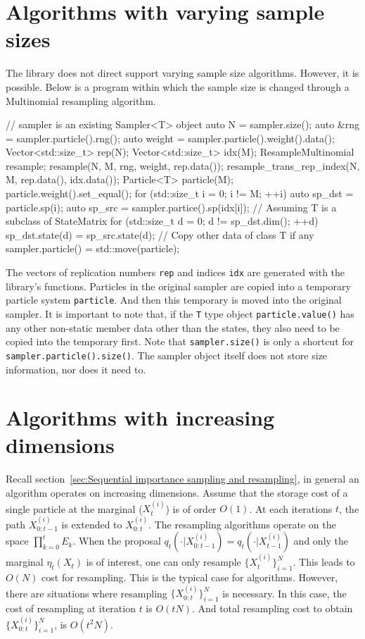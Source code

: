 \section{Algorithms with varying sample sizes}
\label{sec:Algorithms with varying sample sizes}

The library does not direct support varying sample size algorithms. However, it
is possible. Below is a program within which the sample size is changed through
a Multinomial resampling algorithm.
\begin{cppcode}
  // sampler is an existing Sampler<T> object
  auto N = sampler.size();
  auto &rng = sampler.particle().rng();
  auto weight = sampler.particle().weight().data();
  Vector<std::size_t> rep(N);
  Vector<std::size_t> idx(M);
  ResampleMultinomial resample;
  resample(N, M, rng, weight, rep.data());
  resample_trans_rep_index(N, M, rep.data(), idx.data());
  Particle<T> particle(M);
  particle.weight().set_equal();
  for (std::size_t i = 0; i != M; ++i) {
      auto sp_dst = particle.sp(i);
      auto sp_src = sampler.partice().sp(idx[i]);
      // Assuming T is a subclass of StateMatrix
      for (std::size_t d = 0; d != sp_dst.dim(); ++d)
          sp_dst.state(d) = sp_src.state(d);
  }
  // Copy other data of class T if any
  sampler.particle() = std::move(particle);
\end{cppcode}
The vectors of replication numbers \verb|rep| and indices \verb|idx| are
generated with the library's functions. Particles in the original sampler are
copied into a temporary particle system \verb|particle|. And then this
temporary is moved into the original sampler. It is important to note that, if
the \verb|T| type object \verb|particle.value()| has any other non-static
member data other than the states, they also need to be copied into the
temporary first. Note that \verb|sampler.size()| is only a shortcut for
\verb|sampler.particle().size()|. The sampler object itself does not store size
information, nor does it need to.

\section{Algorithms with increasing dimensions}
\label{sec:Algorithms with increasing dimensions}

Recall section~\ref{sec:Sequential importance sampling and resampling}, in
general an \sis algorithm operates on increasing dimensions. Assume that the
storage cost of a single particle at the marginal ($X_t^{(i)}$) is of order
$O(1)$. At each iterations $t$, the path $X_{0:t-1}^{(i)}$ is extended to
$X_{0:t}^{(i)}$. The resampling algorithms operate on the space
$\prod_{k=0}^tE_k$. When the proposal $q_t(\cdot|X_{0:t-1}^{(i)}) =
q_t(\cdot|X_{t-1}^{(i)})$ and only the marginal $\eta_t(X_t)$ is of interest,
one can only resample $\{X_t^{(i)}\}_{i=1}^N$. This leads to $O(N)$ cost for
resampling. This is the typical case for \smc algorithms. However, there are
situations where resampling $\{X_{0:t}^{(i)}\}_{i=1}^N$ is necessary. In this
case, the cost of resampling at iteration $t$ is $O(tN)$. And total resampling
cost to obtain $\{X_{0:t}^{(i)}\}_{i=1}^N$, is $O(t^2N)$.

